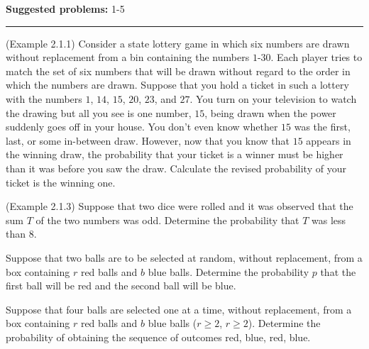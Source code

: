 \documentclass[12pt,reqno]{amsart}
\begin{document}
\textbf{Suggested problems:} 1-5 

\bigskip
\hrule

\bigskip

\prob (Example 2.1.1) Consider a state lottery game in which six numbers are drawn without replacement from a bin containing the numbers $1$-$30$. Each player tries to match the set of six numbers that will be drawn without regard to the order in which the numbers are drawn. Suppose that you hold a ticket in such a lottery with the numbers $1$, $14$, $15$, $20$, $23$, and $27$. You turn on your television to watch the drawing but all you see is one number, $15$, being drawn when the power suddenly goes off in your house. You don’t even know whether $15$ was the first, last, or some in-between draw. However, now that you know that $15$ appears in the winning draw, the probability that your ticket is a winner must be higher than it was before you saw the draw. Calculate the revised probability of your ticket is the winning one.

\vfill
\prob (Example 2.1.3) Suppose that two dice were rolled and it was observed that the sum $T$ of the two numbers was odd. Determine the probability that $T$ was less than $8$.

\vfill
\newpage
\prob
Suppose that two balls are to be selected at random, without replacement, from a box containing $r$ red balls and $b$ blue balls. Determine the probability $p$ that the first ball will be red and the second ball will be blue.

\vfill
\prob Suppose that four balls are selected one at a time, without replacement, from a box containing $r$ red balls and $b$ blue balls ($r\geq 2$, $r\geq 2$). Determine the probability of obtaining the sequence of outcomes red, blue, red, blue.

\vfill
\end{document}
